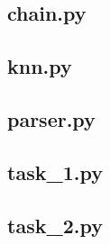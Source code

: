 \documentclass{article}
\begin{document}
\subsection{chain.py}


\subsection{knn.py}


\subsection{parser.py}


\subsection{task\_1.py}


\subsection{task\_2.py}

\end{document}
